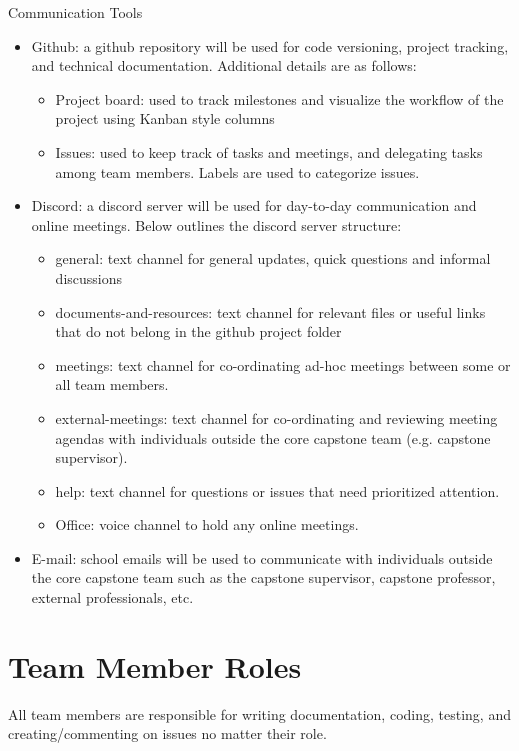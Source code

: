 \documentclass{article}
\begin{document}
Communication Tools
\begin{itemize}
  \item Github: a github repository will be used for code versioning, project tracking, and technical documentation. 
  Additional details are as follows:
  \begin{itemize}
    \item Project board: used to track milestones and visualize the workflow of the project using Kanban style columns
    \item Issues: used to keep track of tasks and meetings, and delegating tasks among team members. Labels are used
     to categorize issues.
  \end{itemize}
  \item Discord: a discord server will be used for day-to-day communication and online meetings. Below outlines the 
  discord server structure:
  \begin{itemize}
    \item general: text channel for general updates, quick questions and informal discussions
    \item documents-and-resources: text channel for relevant files or useful links that do not belong in the github 
    project folder
    \item meetings: text channel for co-ordinating ad-hoc meetings between some or all team members.
    \item external-meetings: text channel for co-ordinating and reviewing meeting agendas with individuals 
    outside the core capstone team (e.g. capstone supervisor).
    \item help: text channel for questions or issues that need prioritized attention.
    \item Office: voice channel to hold any online meetings.
  \end{itemize}
  \item E-mail: school emails will be used to communicate with individuals outside the core capstone team such as the 
  capstone supervisor, capstone professor, external professionals, etc.
\end{itemize}

\section{Team Member Roles}

All team members are responsible for writing documentation, coding, testing, and creating/commenting on issues no 
matter their role.
\end{document}
